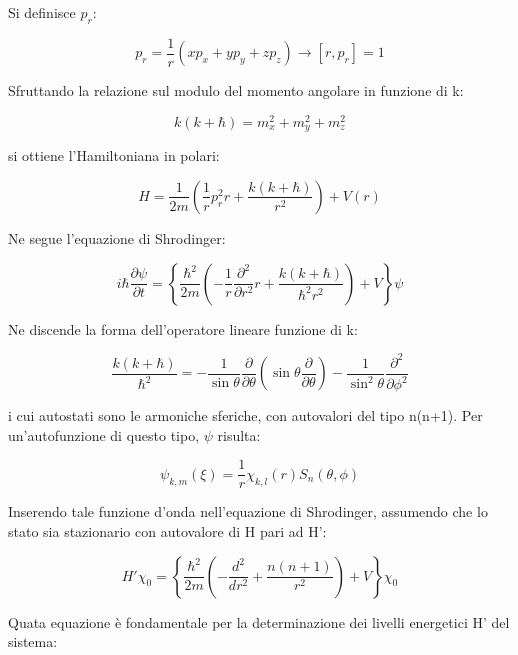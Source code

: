 \documentclass{article}
\begin{document}
Si definisce $p_r$:

\begin{equation}
    p_r=\frac{1}{r}(xp_x+yp_y+zp_z) \rightarrow [r, p_r]=1
\end{equation}

Sfruttando la relazione sul modulo del momento angolare in funzione di k:

\begin{equation}
    k(k+\hbar)=m_x^2+m_y^2+m_z^2
\end{equation}

si ottiene l'Hamiltoniana in polari:

\begin{equation}
    H=\frac{1}{2m}\left ( \frac{1}{r}p_r^2 r +\frac{k(k+\hbar)}{r^2}\right )+V(r)
\end{equation}

Ne segue l'equazione di Shrodinger:

\begin{equation}
    i\hbar \frac{\partial \psi}{\partial t}= \left \{ \frac{\hbar^2}{2m}\left ( -\frac{1}{r}\frac{\partial^2}{\partial r^2}r+\frac{k(k+\hbar)}{\hbar^2r^2} \right ) +V \right \} \psi
\end{equation}

Ne discende la forma dell'operatore lineare funzione di k:

\begin{equation}
    \frac{k(k+\hbar)}{\hbar^2}= -\frac{1}{\sin{\theta}}\frac{\partial}{\partial \theta}\left ( \sin{\theta}\frac{\partial}{\partial \theta} \right ) - \frac{1}{\sin^2{\theta}}\frac{\partial^2}{\partial \phi^2}
\end{equation}

i cui autostati sono le armoniche sferiche, con autovalori del tipo n(n+1). Per un'autofunzione di questo tipo, $\psi$ risulta:

\begin{equation}
    \psi_{k,m}(\xi)=\frac{1}{r}\chi_{k,l}(r)S_n(\theta, \phi)
\end{equation}

Inserendo tale funzione d'onda nell'equazione di Shrodinger, assumendo che lo stato sia stazionario con autovalore di H pari ad H':

\begin{equation}
    H' \chi_0=\left\{\frac{\hbar^2}{2m}\left( -\frac{d^2}{dr^2}+\frac{n(n+1)}{r^2}\right)+V \right\}\chi_0
\end{equation}

Quata equazione è fondamentale per la determinazione dei livelli energetici H' del sistema:
\end{document}
